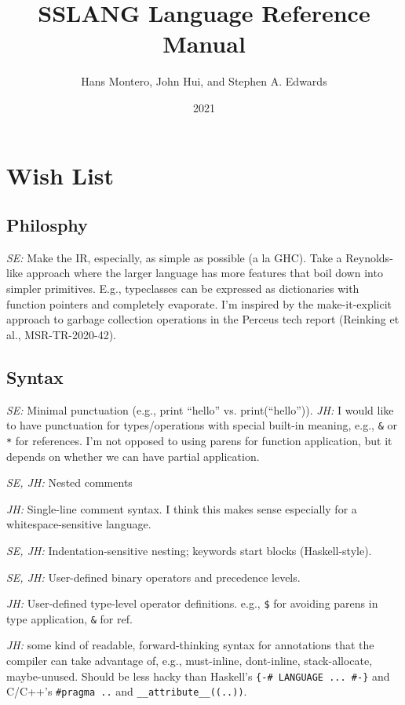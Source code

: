 \documentclass{article}
\title{SSLANG Language Reference Manual}
\author{Hans Montero, John Hui, and Stephen A. Edwards}
\date{2021}
\begin{document}
\maketitle

\section{Wish List}

\subsection{Philosphy}

\textit{SE:} Make the IR, especially, as simple as possible (a la
GHC). Take a Reynolds-like approach where the larger language has more
features that boil down into simpler primitives.  E.g., typeclasses
can be expressed as dictionaries with function pointers and completely
evaporate.  I'm inspired by the make-it-explicit approach to garbage
collection operations in the Perceus tech report (Reinking et al.,
MSR-TR-2020-42).

\subsection{Syntax}

\textit{SE:} Minimal punctuation (e.g., print ``hello'' vs. print(``hello'')).
\textit{JH:} I would like to have punctuation for types/operations with special
built-in meaning, e.g., \verb|&| or \verb|*| for references. I'm not opposed to
using parens for function application, but it depends on whether we can have
partial application.

\textit{SE, JH:} Nested comments

\textit{JH:} Single-line comment syntax. I think this makes sense especially for
a whitespace-sensitive language.

\textit{SE, JH:} Indentation-sensitive nesting; keywords start blocks (Haskell-style).

\textit{SE, JH:} User-defined binary operators and precedence levels.

\textit{JH:} User-defined type-level operator definitions. e.g., \verb|$| for
avoiding parens in type application, \verb|&| for ref.

\textit{JH:} some kind of readable, forward-thinking syntax for annotations that
the compiler can take advantage of, e.g., must-inline, dont-inline,
stack-allocate, maybe-unused. Should be less hacky than Haskell's
\verb|{-# LANGUAGE ... #-}| and C/C++'s \verb|#pragma ..| and
\verb|__attribute__((..))|.
\end{document}
